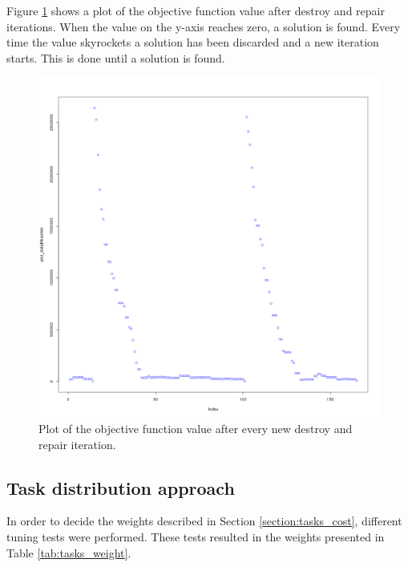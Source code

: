Figure \ref{fig:feasibleRerun} shows a plot of the objective function value after destroy and repair iterations. When the value on the y-axis reaches zero, a solution is found. Every time the value skyrockets a solution has been discarded and a new iteration starts. This is done until a solution is found. 

\begin{figure}[!h]
\centering
\includegraphics[scale = 0.3]{Chapters/ImagesClaes/Rfeasible.png}
\caption{Plot of the objective function value after every new destroy and repair iteration.}
\label{fig:feasibleRerun}
\end{figure}

\subsection{Task distribution approach}\label{sec:task_dist_res}

In order to decide the weights described in Section \ref{section:tasks_cost}, different tuning tests were performed. These tests resulted in the weights presented in Table \ref{tab:tasks_weight}. 

